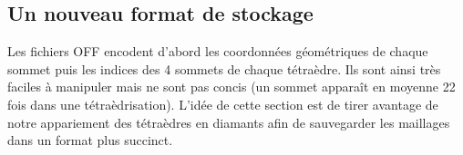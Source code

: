 
\subsection{Un nouveau format de stockage}
\noindent
Les fichiers OFF encodent d'abord les coordonnées géométriques de chaque sommet puis les indices des 4 sommets de chaque tétraèdre. Ils sont ainsi très faciles à manipuler mais ne sont pas concis (un sommet apparaît en moyenne 22 fois dans une tétraèdrisation). L'idée de cette section est de tirer avantage de notre appariement des tétraèdres en diamants afin de sauvegarder les maillages dans un format plus succinct.
